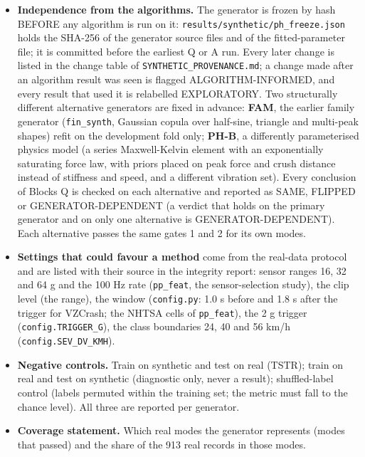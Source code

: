 \begin{itemize}
\item \textbf{Independence from the algorithms.} The generator is frozen by hash BEFORE any algorithm is run on it: \texttt{results/synthetic/ph\_freeze.json} holds the SHA-256 of the generator source files and of the fitted-parameter file; it is committed before the earliest Q or A run. Every later change is listed in the change table of \texttt{SYNTHETIC\_PROVENANCE.md}; a change made after an algorithm result was seen is flagged ALGORITHM-INFORMED, and every result that used it is relabelled EXPLORATORY. Two structurally different alternative generators are fixed in advance: \textbf{FAM}, the earlier family generator (\texttt{fin\_synth}, Gaussian copula over half-sine, triangle and multi-peak shapes) refit on the development fold only; \textbf{PH-B}, a differently parameterised physics model (a series Maxwell-Kelvin element with an exponentially saturating force law, with priors placed on peak force and crush distance instead of stiffness and speed, and a different vibration set). Every conclusion of Blocks Q is checked on each alternative and reported as SAME, FLIPPED or GENERATOR-DEPENDENT (a verdict that holds on the primary generator and on only one alternative is GENERATOR-DEPENDENT). Each alternative passes the same gates 1 and 2 for its own modes.
\item \textbf{Settings that could favour a method} come from the real-data protocol and are listed with their source in the integrity report: sensor ranges 16, 32 and 64 g and the 100 Hz rate (\texttt{pp\_feat}, the sensor-selection study), the clip level (the range), the window (\texttt{config.py}: 1.0 s before and 1.8 s after the trigger for VZCrash; the NHTSA cells of \texttt{pp\_feat}), the 2 g trigger (\texttt{config.TRIGGER\_G}), the class boundaries 24, 40 and 56 km/h (\texttt{config.SEV\_DV\_KMH}).
\item \textbf{Negative controls.} Train on synthetic and test on real (TSTR); train on real and test on synthetic (diagnostic only, never a result); shuffled-label control (labels permuted within the training set; the metric must fall to the chance level). All three are reported per generator.
\item \textbf{Coverage statement.} Which real modes the generator represents (modes that passed) and the share of the 913 real records in those modes.
\end{itemize}

